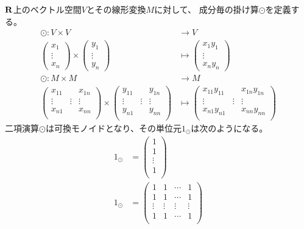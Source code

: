 ${\mathbf{R}}$上のベクトル空間$V$とその線形変換$M$に対して、
成分毎の掛け算$\odot$を定義する。
\begin{equation}\begin{split}
	\odot: V\times V &\to V \\
		\begin{pmatrix}x_1\\ \vdots\\ x_n\end{pmatrix}
		\times \begin{pmatrix}y_1\\ \vdots\\ y_n\end{pmatrix}
		&\mapsto \begin{pmatrix}x_1y_1\\ \vdots\\ x_ny_n\end{pmatrix} \\
	\odot: M\times M &\to M \\
	\begin{pmatrix}
		x_{11} & & x_{1n} \\ 
		\vdots & \vdots & \vdots \\ 
		x_{n1} & & x_{nn} \\ 
	\end{pmatrix}
	\times \begin{pmatrix}
		y_{11} & & y_{1n} \\ 
		\vdots & \vdots & \vdots \\ 
		y_{n1} & & y_{nn} \\ 
	\end{pmatrix}
	&\mapsto \begin{pmatrix}
		x_{11}y_{11} & & x_{1n}y_{1n} \\ 
		\vdots & \vdots & \vdots \\ 
			x_{n1}y_{n1} & & x_{nn}y_{nn} \\ 
		\end{pmatrix}
\end{split}\end{equation}
二項演算$\odot$は可換モノイドとなり、その単位元$1_\odot$は次のようになる。
\begin{equation}\begin{split}
	1_\odot &= \begin{pmatrix}
		1 \\
		1 \\
		\vdots \\
		1 \\
		\end{pmatrix} \\
	1_\odot &= \begin{pmatrix}
		1 & 1 & \cdots & 1 \\
		1 & 1 & \cdots & 1 \\
		\vdots & \vdots & \vdots & \vdots \\
		1 & 1 & \cdots & 1 \\
		\end{pmatrix} \\
\end{split}\end{equation}
